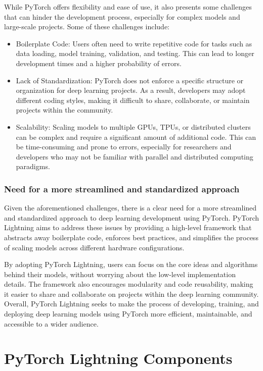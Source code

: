 \documentclass[12pt]{article}
\begin{document}
While PyTorch offers flexibility and ease of use, it also presents some challenges that can hinder the development process, especially for complex models and large-scale projects. Some of these challenges include:

\begin{itemize}
    \item Boilerplate Code: Users often need to write repetitive code for tasks such as data loading, model training, validation, and testing. This can lead to longer development times and a higher probability of errors.
    \item Lack of Standardization: PyTorch does not enforce a specific structure or organization for deep learning projects. As a result, developers may adopt different coding styles, making it difficult to share, collaborate, or maintain projects within the community.
    \item Scalability: Scaling models to multiple GPUs, TPUs, or distributed clusters can be complex and require a significant amount of additional code. This can be time-consuming and prone to errors, especially for researchers and developers who may not be familiar with parallel and distributed computing paradigms.
\end{itemize}

\subsubsection{Need for a more streamlined and standardized approach}

Given the aforementioned challenges, there is a clear need for a more streamlined and standardized approach to deep learning development using PyTorch.
PyTorch Lightning aims to address these issues by providing a high-level framework that abstracts away boilerplate code, enforces best practices, and simplifies the process of scaling models across different hardware configurations.

By adopting PyTorch Lightning, users can focus on the core ideas and algorithms behind their models, without worrying about the low-level implementation details.
The framework also encourages modularity and code reusability, making it easier to share and collaborate on projects within the deep learning community.
Overall, PyTorch Lightning seeks to make the process of developing, training, and deploying deep learning models using PyTorch more efficient, maintainable, and accessible to a wider audience.

\section{PyTorch Lightning Components}
\end{document}
